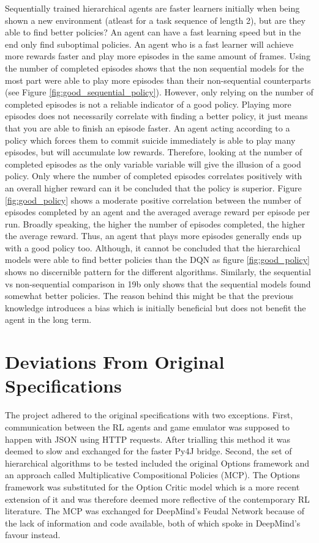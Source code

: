 \documentclass[notitlepage,a4paper,11pt]{article}
\begin{document}
Sequentially trained hierarchical agents are faster learners initially when being shown a new environment (atleast for a task sequence of length 2), but are they able to find better policies? An agent can have a fast learning speed but in the end only find suboptimal policies. An agent who is a fast learner will achieve more rewards faster and play more episodes in the same amount of frames. Using the number of completed episodes shows that the non sequential models for the most part were able to play more episodes than their non-sequential counterparts (see Figure \ref{fig:good_sequential_policy}). However, only relying on the number of completed episodes is not a reliable indicator of a good policy. Playing more episodes does not necessarily correlate with finding a better policy, it just means that you are able to finish an episode faster. An agent acting according to a policy which forces them to commit suicide immediately is able to play many episodes, but will accumulate low rewards. Therefore, looking at the number of completed episodes as the only variable variable will give the illusion of a good policy. Only where the number of completed episodes correlates positively with an overall higher reward can it be concluded that the policy is superior. Figure \ref{fig:good_policy} shows a moderate positive correlation between the number of episodes completed by an agent and the averaged average reward per episode per run. Broadly speaking, the higher the number of episodes completed, the higher the average reward. Thus, an agent that plays more episodes generally ends up with a good policy too. Although, it cannot be concluded that the hierarchical models were able to find better policies than the DQN as figure \ref{fig:good_policy} shows no discernible pattern for the different algorithms. Similarly, the sequential vs non-sequential comparison in 19b only shows that the sequential models found somewhat better policies. The reason behind this might be that the previous knowledge introduces a bias which is initially beneficial but does not benefit the agent in the long term. 

\section{Deviations From Original Specifications}
The project adhered to the original specifications with two exceptions. First, communication between the RL agents and game emulator was supposed to happen with JSON using HTTP requests. After trialling this method it was deemed to slow and exchanged for the faster Py4J bridge. Second, the set of hierarchical algorithms to be tested included the original Options framework and an approach called Multiplicative Compositional Policies (MCP). The Options framework was substituted for the Option Critic model which is a more recent extension of it and was therefore deemed more reflective of the contemporary RL literature. The MCP was exchanged for DeepMind's Feudal Network because of the lack of information and code available, both of which spoke in DeepMind's favour instead.
\end{document}
